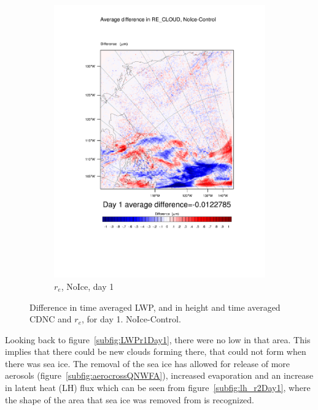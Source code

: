 \begin{figure}
	\begin{subfigure}{0.48\textwidth}
		\centering
		\includegraphics[width=\textwidth]{results/noice/diff_NoIce_RE_CLOUD_Day1.pdf}
		\caption{$r_e$, NoIce, day 1}
		\label{subfig:recloud_r2Day1}
	\end{subfigure}
\caption{Difference in time averaged LWP, and in height and time averaged CDNC and $r_e$, for day 1. NoIce-Control.}
\label{fig:lwpcdncre_r2Day1}
\end{figure}

Looking back to figure~\ref{subfig:LWPr1Day1}, there were no low in that area. This implies that there could be new clouds forming there, that could not form when there was sea ice. The removal of the sea ice has allowed for release of more aerosols (figure~\ref{subfig:aerocrossQNWFA}), increased evaporation and an increase in latent heat (LH) flux which can be seen from figure~\ref{subfig:lh_r2Day1}, where the shape of the area that sea ice was removed from is recognized. 

